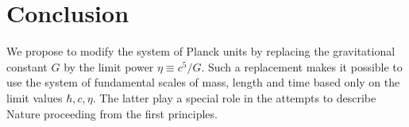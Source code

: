 \documentclass [12pt]{article}
\begin{document}
\section{Conclusion}

We propose to modify the system of Planck units by replacing the gravitational constant  $G$ by the limit power $\eta  \equiv {c^5}/G$. Such a replacement  makes it possible to use the system of fundamental scales of mass, length and time based only on the limit values  $\hbar, c, \eta $. The latter play a special role in the attempts to describe Nature proceeding from the first principles.
\end{document}
